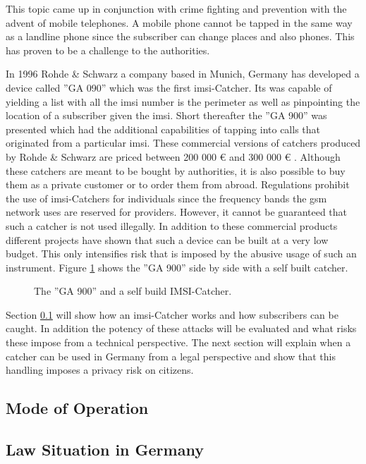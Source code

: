 This topic came up in conjunction with crime fighting and prevention with the advent of mobile telephones.
A mobile phone cannot be tapped in the same way as a landline phone since the subscriber can change places and also phones.
This has proven to be a challenge to the authorities.

In 1996 Rohde \& Schwarz a company based in Munich, Germany has developed a device called ''GA 090'' which was the first \gls{imsi}-Catcher.
Its was capable of yielding a list with all the \gls{imsi} number is the perimeter as well as pinpointing the location of a subscriber given the \gls{imsi}.
Short thereafter the ''GA 900'' was presented which had the additional capabilities of tapping into calls that originated from a particular \gls{imsi}.
These commercial versions of catchers produced by Rohde \& Schwarz are priced between 200 000 \euro{} and 300 000 \euro{} \cite{fox}.
Although these catchers are meant to be bought by authorities, it is also possible to buy them as a private customer or to order them from abroad.
Regulations prohibit the use of \gls{imsi}-Catchers for individuals since the frequency bands the \gls{gsm}  network uses are reserved for providers.
However, it cannot be guaranteed that such a catcher is not used illegally.
In addition to these commercial products different projects \cite{dennis, ccc_catcher} have shown that such a device can be built at a very low budget.
This only intensifies risk that is imposed by the abusive usage of such an instrument.
Figure \ref{fig:catchers} shows the ''GA 900'' side by side with a self built catcher.
\begin{figure}
\centering
\caption{The ''GA 900'' and a self build IMSI-Catcher.}
\label{fig:catchers}
\end{figure}

Section \ref{sec:catcher_operation} will show how an \gls{imsi}-Catcher works and how subscribers can be caught.
In addition the potency of these attacks will be evaluated and what risks these impose from a technical perspective.
The next section will explain when a catcher can be used in Germany from a legal perspective and show that this handling imposes a privacy risk on citizens.

\subsection{Mode of Operation}
\label{sec:catcher_operation}

\subsection{Law Situation in Germany}
\label{sec:catcher_law}

